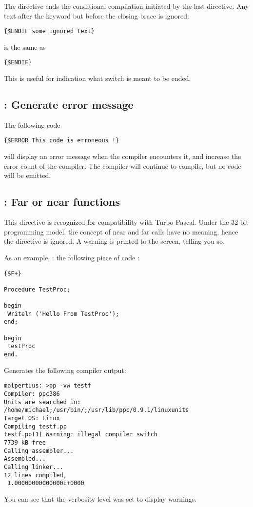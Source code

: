 \documentclass{report}
\begin{document}
The  directive ends the conditional compilation initiated by the
last  directive. Any text after the  keyword but
before the closing brace is ignored:
\begin{verbatim}
{$ENDIF some ignored text}
\end{verbatim}
is the same as
\begin{verbatim}
{$ENDIF}
\end{verbatim}
This is useful for indication what switch is meant to be ended.

\subsection{ : Generate error message}

The following code
\begin{verbatim}
{$ERROR This code is erroneous !}
\end{verbatim}
will display an error message when the compiler encounters it, 
and increase the error count of the compiler. 
The compiler will continue to compile, but no code will be emitted.

\subsection{ : Far or near functions}
This directive is recognized for compatibility with Turbo Pascal. Under the
32-bit programming model, the concept of near and far calls have no meaning,
hence the directive is ignored. A warning is printed to the screen, telling
you so.

As an example, : the following piece of code :
\begin{verbatim}
{$F+}

Procedure TestProc;

begin
 Writeln ('Hello From TestProc');
end;

begin
 testProc
end.
\end{verbatim}
Generates the following compiler output:
\begin{verbatim}
malpertuus: >pp -vw testf
Compiler: ppc386
Units are searched in: /home/michael;/usr/bin/;/usr/lib/ppc/0.9.1/linuxunits
Target OS: Linux
Compiling testf.pp
testf.pp(1) Warning: illegal compiler switch
7739 kB free
Calling assembler...
Assembled...
Calling linker...
12 lines compiled,
 1.00000000000000E+0000
\end{verbatim}
You can see that the verbosity level was set to display warnings.
\end{document}
